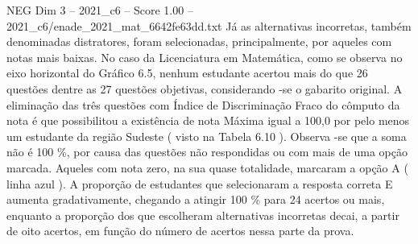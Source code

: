 \begin{textsample}{NEG Dim 3 – 2021\_c6 – Score 1.00 – 2021\_c6/enade\_2021\_mat\_6642fe63dd.txt}
Já as alternativas incorretas, também denominadas distratores, foram selecionadas, principalmente, por aqueles com notas mais baixas.
No caso da Licenciatura em Matemática, como se observa no eixo horizontal do Gráfico 6.5, nenhum estudante acertou mais do que 26 questões dentre as 27 questões objetivas, considerando -se o gabarito original.
A eliminação das três questões com Índice de Discriminação Fraco do cômputo da nota é que possibilitou a existência de nota Máxima igual a 100,0 por pelo menos um estudante da região Sudeste ( visto na Tabela 6.10 ).
Observa -se que a soma não é 100 \%, por causa das questões não respondidas ou com mais de uma opção marcada.
Aqueles com nota zero, na sua quase totalidade, marcaram a opção A ( linha azul ).
A proporção de estudantes que selecionaram a resposta correta E aumenta gradativamente, chegando a atingir 100 \% para 24 acertos ou mais, enquanto a proporção dos que escolheram alternativas incorretas decai, a partir de oito acertos, em função do número de acertos nessa parte da prova.

\end{textsample}
